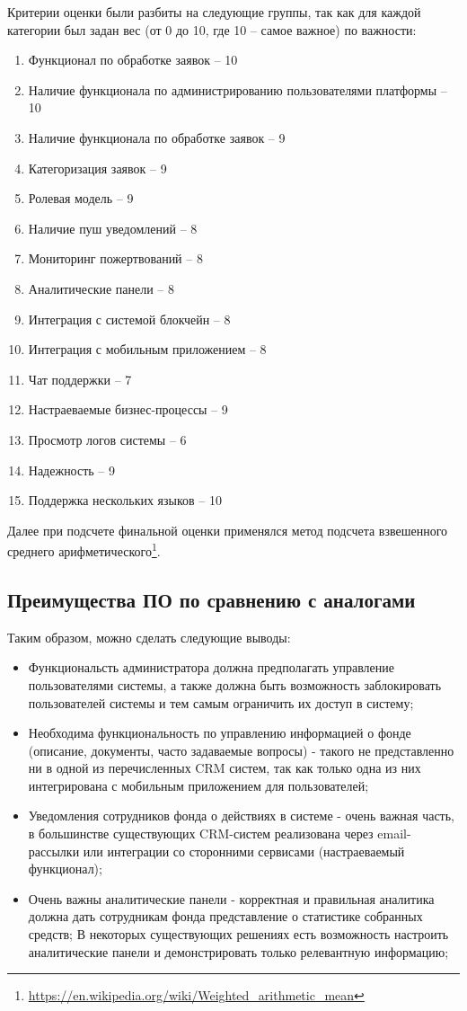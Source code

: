 \documentclass[a4paper,12pt,reqno]{article}
\begin{document}
Критерии оценки были разбиты на следующие группы, так как для каждой категории был задан вес (от 0 до 10, где 10 -- самое важное) по важности: 
\begin{enumerate}
	
	\item Функционал по обработке заявок -- 10
	\item Наличие функционала по администрированию пользователями платформы -- 10
	\item Наличие функционала по обработке заявок -- 9
	\item Категоризация заявок -- 9
	\item Ролевая модель -- 9
	\item Наличие пуш уведомлений -- 8
	\item Мониторинг пожертвований -- 8
	\item Аналитические панели -- 8
	\item Интеграция с системой блокчейн -- 8
	\item Интеграция с мобильным приложением -- 8
	\item Чат поддержки -- 7
	\item Настраеваемые бизнес-процессы -- 9
	\item Просмотр логов системы -- 6
	\item Надежность -- 9
	\item Поддержка нескольких языков -- 10
\end{enumerate}

Далее при подсчете финальной оценки применялся метод подсчета взвешенного среднего арифметического\footnote{\url{https://en.wikipedia.org/wiki/Weighted_arithmetic_mean}}. 

\subsection{Преимущества ПО по сравнению с аналогами}

Таким образом, можно сделать следующие выводы:
\begin{itemize}
    \item Функциональсть администратора должна предполагать управление пользователями системы, а также должна быть возможность заблокировать пользователей системы и тем самым ограничить их доступ в систему;
    \item Необходима функциональность по управлению информацией о фонде (описание, документы, часто задаваемые вопросы) - такого не представленно ни в одной из перечисленных CRM систем, так как только одна из них  интегрирована с мобильным приложением для пользователей;
    \item Уведомления сотрудников фонда о действиях в системе - очень важная часть, в большинстве существующих CRM-систем реализована через email-рассылки или интеграции со сторонними сервисами (настраеваемый функционал);
    \item Очень важны аналитические панели - корректная и правильная аналитика должна дать сотрудникам фонда представление о статистике собранных средств; В некоторых существующих решениях есть возможность настроить аналитические панели и демонстрировать только релевантную информацию;
\end{itemize}
\end{document}
